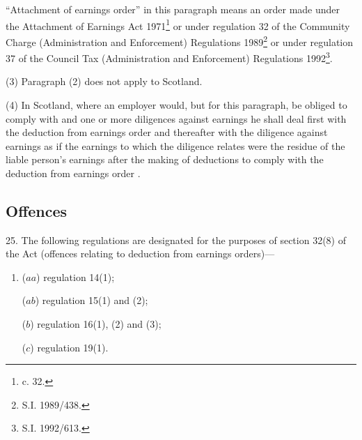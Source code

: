 \documentclass[12pt,a4paper]{article}
\begin{document}
“Attachment of earnings order” in this paragraph means an order made under the Attachment of Earnings Act 1971\footnote{ c. 32.} or under regulation 32 of the Community Charge (Administration and Enforcement) Regulations 1989\footnote{\frenchspacing S.I. 1989/438.}
or under regulation 37 of the Council Tax (Administration and Enforcement) Regulations 1992\footnote{\frenchspacing  S.I. 1992/613.}. %

(3) Paragraph (2) does not apply to Scotland.

(4) In Scotland, where an employer would, but for this paragraph, be obliged to comply with 
and one or more diligences against earnings he shall deal first with the deduction from earnings order%
and thereafter with the diligence against earnings as if the earnings to which the diligence relates were the residue of the liable person’s earnings after the making of deductions to comply with the deduction from earnings order%
.


\subsection[25. Offences]{Offences}

25.  The following regulations are designated for the purposes of section 32(8) of the Act (offences relating to deduction from earnings orders)—
\begin{enumerate}\item[]
($aa$) regulation 14(1);

($ab$)  %
regulation 15(1) and (2);

($b$) regulation 16(1), (2) and (3);

($c$) regulation 19(1).
\end{enumerate}
\end{document}
